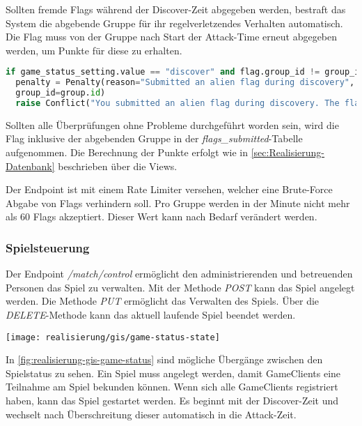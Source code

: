 Sollten fremde Flags während der Discover-Zeit abgegeben werden, bestraft das System die abgebende Gruppe für ihr regelverletzendes Verhalten automatisch. Die Flag muss von der Gruppe nach Start der Attack-Time erneut abgegeben werden, um Punkte für diese zu erhalten.

\begin{lstlisting}[language=Python, frame=single, caption={GIS Strafe für abgeben fremder Flags}, captionpos=b, label={lst:gis-flag-penatly}]
if game_status_setting.value == "discover" and flag.group_id != group_id:
  penalty = Penalty(reason="Submitted an alien flag during discovery", points=penalty_points,
  group_id=group.id)
  raise Conflict("You submitted an alien flag during discovery. The flag is not accepted. You'll be punished.")
\end{lstlisting}

Sollten alle Überprüfungen ohne Probleme durchgeführt worden sein, wird die Flag inklusive der abgebenden Gruppe in der \textit{flags\_submitted}-Tabelle aufgenommen. Die Berechnung der Punkte erfolgt wie in \autoref{sec:Realisierung-Datenbank} beschrieben über die Views.

Der Endpoint ist mit einem Rate Limiter versehen, welcher eine Brute-Force Abgabe von Flags verhindern soll. Pro Gruppe werden in der Minute nicht mehr als 60 Flags akzeptiert. Dieser Wert kann nach Bedarf verändert werden.

\subsubsection{Spielsteuerung}
Der Endpoint \textit{/match/control} ermöglicht den administrierenden und betreuenden Personen das Spiel zu verwalten. Mit der Methode \textit{POST} kann das Spiel angelegt werden. Die Methode \textit{PUT} ermöglicht das Verwalten des Spiels. Über die \textit{DELETE}-Methode kann das aktuell laufende Spiel beendet werden.

\begin{center}
	\texttt{[image: realisierung/gis/game-status-state]}
	\label{fig:realisierung-gis-game-status}
\end{center}

In \autoref{fig:realisierung-gis-game-status} sind mögliche Übergänge zwischen den Spielstatus zu sehen. Ein Spiel muss angelegt werden, damit GameClients eine Teilnahme am Spiel bekunden können. Wenn sich alle GameClients registriert haben, kann das Spiel gestartet werden. Es beginnt mit der Discover-Zeit und wechselt nach Überschreitung dieser automatisch in die Attack-Zeit.

